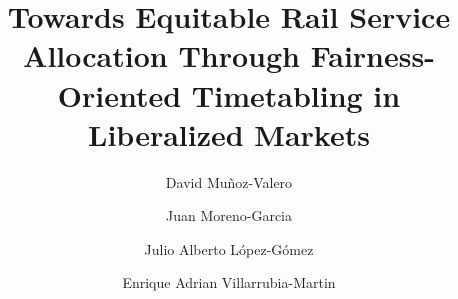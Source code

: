 \documentclass[preprint,12pt]{elsarticle}
\begin{document}
\begin{frontmatter}



\title{Towards Equitable Rail Service Allocation Through Fairness-Oriented Timetabling in Liberalized Markets} %



\author[A]{David Muñoz-Valero }
\author[A]{Juan Moreno-Garcia }
\author[B]{Julio Alberto López-Gómez }
\author[B]{Enrique Adrian Villarrubia-Martin } 

\address[A]{Escuela de Ingeniería Industrial y Aeroespacial de Toledo, Department of Technologies and Information Systems, Universidad de Castilla-La Mancha, Avenida Carlos III, s/n, Toledo, 45071, Spain}
\address[B]{Escuela Superior de Informática, Department of Technologies and Information Systems, Universidad de Castilla-La Mancha, Paseo de la Universidad 4, Ciudad Real, 13071, Spain}


\end{frontmatter}
\end{document}
